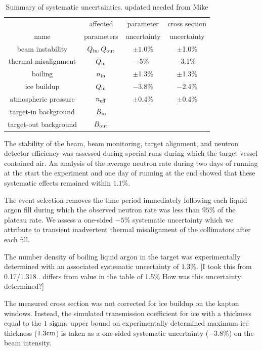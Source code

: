 \documentclass[%
 reprint,
superscriptaddress,
 preprintnumbers,
 nofootinbib,
 nobibnotes,
 bibnotes,
 amsmath,amssymb,
 aps,
 prl, 
 floatfix,
]{revtex4-1}
\begin{document}
\begin{table}[h!]
    \centering
    \begin{tabular}{|c|c|c|c|}
\hline
& affected & parameter & cross section  \\
    name & parameters & uncertainty & uncertainty \\ \hline        
beam instability & $Q_{\rm in}, Q_{\rm out}$ & $\pm 1.0\%$ & $\pm$1.0\%\\   
thermal misalignment & $Q_{\rm in}$ & -5\% & -3.1\% \\
boiling & $n_{\rm in}$ & $\pm$1.3\% & $\pm$1.3\%\\
ice buildup & $Q_{\rm in}$ & $-$3.8\% & $-$2.4\%\\   
atmospheric pressure & $n_{\rm eff}$ & $\pm 0.4\%$ & $\pm 0.4\%$ \\
target-in background & $B_{\rm in}$ & & \\
target-out background & $B_{\rm out}$ & & \\
\hline
    \end{tabular}
    \caption{Summary of systematic uncertainties. {\color{red} updated needed from Mike}}
    \label{tab:uncertainties}
\end{table}

The stability of the beam, beam monitoring, target alignment, and
neutron detector efficiency was assessed during special runs during
which the target vessel contained air.  An analysis of the average
neutron rate during two days of running at the start the experiment
and one day of running at the end showed that these systematic effects
remained within $1.1\%$.

The event selection removes the time period immediately following each
liquid argon fill during which the observed neutron rate was less than
$95\%$ of the plateau rate.  We assess a one-sided $-5\%$ systematic
uncertainty which we attribute to transient inadvertent thermal
misalignment of the collimators after each fill.

The number density of boiling liquid argon in the target was
experimentally determined with an associated systematic uncertainty of
$1.3\%$.  {\color{red} [I took this from 0.17/1.318.. differs from value in the table of 1.5\%  How was this uncertainty determined?]}

The measured cross section was not corrected for ice buildup on the
kapton windows.  Instead, the simulated transmission coefficient for
ice with a thickness equal to the $1~\rm sigma$ upper bound on
experimentally determined maximum ice thickness ($1.3 \rm cm$) is
taken as a one-sided systematic uncertainty ($-3.8\%$) on the beam
intensity.
  
\end{document}
